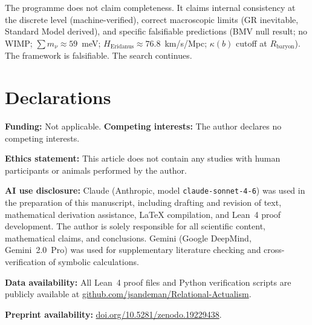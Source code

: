 \documentclass[11pt,a4paper]{article}
\begin{document}
The programme does not claim completeness. It claims internal consistency
at the discrete level (machine-verified), correct macroscopic limits
(GR inevitable, Standard Model derived), and specific falsifiable
predictions (BMV null result; no WIMP; $\sum m_\nu \approx 59$~meV;
$H_{\mathrm{Eridanus}} \approx 76.8$~km/s/Mpc; $\kappa(b)$ cutoff at
$R_{\mathrm{baryon}}$). The framework is falsifiable. The search continues.


\section*{Declarations}
\textbf{Funding:} Not applicable.\quad
\textbf{Competing interests:} The author declares no competing interests.

\textbf{Ethics statement:} This article does not contain any studies with human participants or animals performed by the author.

\textbf{AI use disclosure:} Claude (Anthropic, model \texttt{claude-sonnet-4-6}) was used in the preparation of this manuscript, including drafting and revision of text, mathematical derivation assistance, \LaTeX{} compilation, and Lean~4 proof development. The author is solely responsible for all scientific content, mathematical claims, and conclusions. Gemini (Google DeepMind, Gemini~2.0~Pro) was used for supplementary literature checking and cross-verification of symbolic calculations.

\textbf{Data availability:} All Lean~4 proof files and Python verification scripts are publicly available at \href{https://github.com/jsandeman/Relational-Actualism}{github.com/jsandeman/Relational-Actualism}.

\textbf{Preprint availability:} \href{https://doi.org/10.5281/zenodo.19229438}{doi.org/10.5281/zenodo.19229438}.


\end{document}
